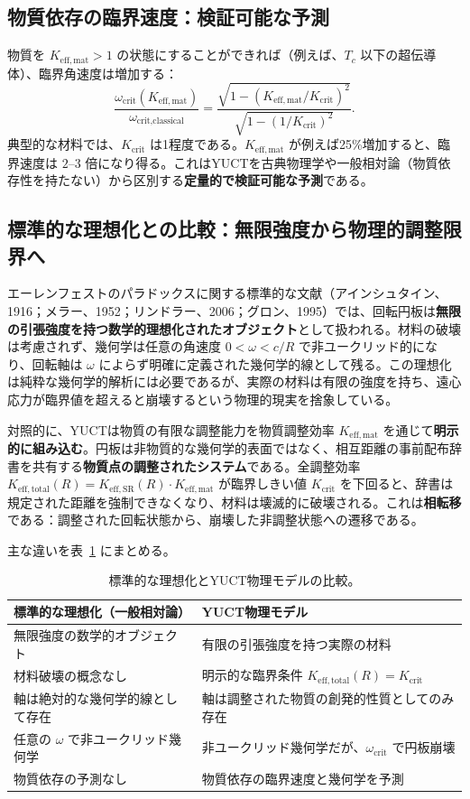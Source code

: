 \documentclass[12pt,a4paper]{article}
\newcommand{\Keffmat}{K_{\mathrm{eff,mat}}}
\newcommand{\Kefftot}{K_{\mathrm{eff,total}}}
\newcommand{\KeffSR}{K_{\mathrm{eff,SR}}}
\newcommand{\Kcrit}{K_{\mathrm{crit}}}
\begin{document}
	\subsection{物質依存の臨界速度：検証可能な予測}
	
	物質を \(K_{\mathrm{eff,mat}} > 1\) の状態にすることができれば（例えば、\(T_c\) 以下の超伝導体）、臨界角速度は増加する：
	\[
	\frac{\omega_{\text{crit}}(K_{\mathrm{eff,mat}})}{\omega_{\text{crit,classical}}} = \frac{ \sqrt{1 - (\Keffmat/\Kcrit)^2} }{ \sqrt{1 - (1/\Kcrit)^2} }.
	\]
	典型的な材料では、\(\Kcrit\) は1程度である。\(\Keffmat\) が例えば25\%増加すると、臨界速度は \(2\)–\(3\) 倍になり得る。これはYUCTを古典物理学や一般相対論（物質依存性を持たない）から区別する\textbf{定量的で検証可能な予測}である。
	
	\subsection{標準的な理想化との比較：無限強度から物理的調整限界へ}
	
	エーレンフェストのパラドックスに関する標準的な文献（アインシュタイン、1916；メラー、1952；リンドラー、2006；グロン、1995）では、回転円板は\textbf{無限の引張強度を持つ数学的理想化されたオブジェクト}として扱われる。材料の破壊は考慮されず、幾何学は任意の角速度 \(0 < \omega < c/R\) で非ユークリッド的になり、回転軸は \(\omega\) によらず明確に定義された幾何学的線として残る。この理想化は純粋な幾何学的解析には必要であるが、実際の材料は有限の強度を持ち、遠心応力が臨界値を超えると崩壊するという物理的現実を捨象している。
	
	対照的に、YUCTは物質の有限な調整能力を物質調整効率 \(K_{\mathrm{eff,mat}}\) を通じて\textbf{明示的に組み込む}。円板は非物質的な幾何学的表面ではなく、相互距離の事前配布辞書を共有する\textbf{物質点の調整されたシステム}である。全調整効率 \(\Kefftot(R) = \KeffSR(R) \cdot \Keffmat\) が臨界しきい値 \(\Kcrit\) を下回ると、辞書は規定された距離を強制できなくなり、材料は壊滅的に破壊される。これは\textbf{相転移}である：調整された回転状態から、崩壊した非調整状態への遷移である。
	
	主な違いを表~\ref{tab:idealization} にまとめる。
	
	\begin{table}[h]
		\centering
		\caption{標準的な理想化とYUCT物理モデルの比較。}
		\label{tab:idealization}
		\begin{tabular}{p{5cm}p{5cm}}
			\toprule
			\textbf{標準的な理想化（一般相対論）} & \textbf{YUCT物理モデル} \\
			\midrule
			無限強度の数学的オブジェクト & 有限の引張強度を持つ実際の材料 \\
			材料破壊の概念なし & 明示的な臨界条件 \(\Kefftot(R) = \Kcrit\) \\
			軸は絶対的な幾何学的線として存在 & 軸は調整された物質の創発的性質としてのみ存在 \\
			任意の \(\omega\) で非ユークリッド幾何学 & 非ユークリッド幾何学だが、\(\omega_{\text{crit}}\) で円板崩壊 \\
			物質依存の予測なし & 物質依存の臨界速度と幾何学を予測 \\
			\bottomrule
		\end{tabular}
	\end{table}
	
\end{document}
